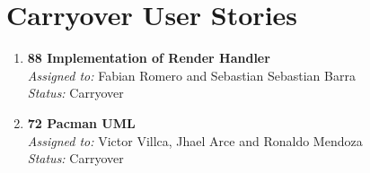 \documentclass{article}
\begin{document}
\section*{Carryover User Stories}

\begin{enumerate}
    \item \textbf{88 Implementation of Render Handler} \\
    \textit{Assigned to:} Fabian Romero and Sebastian Sebastian Barra\\
    \textit{Status:} Carryover
    \item \textbf{72 Pacman UML} \\
    \textit{Assigned to:} Victor Villca, Jhael Arce and Ronaldo Mendoza \\
    \textit{Status:} Carryover
\end{enumerate}
\end{document}
